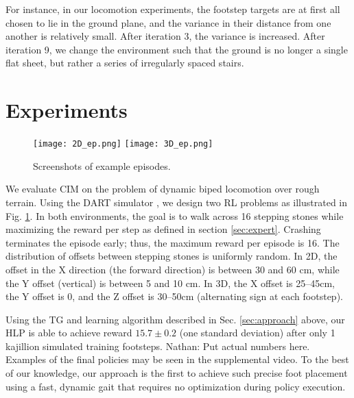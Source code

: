\documentclass[a4paper]{article}
\newcommand{\nhatch}[1]{{\leavevmode\color{magenta} Nathan: #1}}
\begin{document}
For instance, in our locomotion experiments, the footstep targets are at first all chosen to lie in the ground plane, and the variance in their distance from one another is relatively small.
After iteration 3, the variance is increased.
After iteration 9, we change the environment such that the ground is no longer a single flat sheet, but rather a series of irregularly spaced stairs.


\section{Experiments}

\begin{figure}
  \texttt{[image: 2D\_ep.png]}
  \texttt{[image: 3D\_ep.png]}
  \caption{Screenshots of example episodes.\label{fig:example episodes}}
\end{figure}

We evaluate CIM on the problem of dynamic biped locomotion over rough terrain.
Using the DART simulator \citep{lee2018dart}, we design two RL problems as illustrated in Fig. \ref{fig:example episodes}.
In both environments, the goal is to walk across 16 stepping stones while maximizing the reward per step as defined in section \ref{sec:expert}.
Crashing terminates the episode early;
thus, the maximum reward per episode is 16.
The distribution of offsets between stepping stones is uniformly random.
In 2D, the offset in the X direction (the forward direction) is between 30 and 60 cm, while the Y offset (vertical) is between 5 and 10 cm.
In 3D, the X offset is 25--45cm, the Y offset is 0, and the Z offset is 30--50cm (alternating sign at each footstep).

Using the TG and learning algorithm described in Sec. \ref{sec:approach} above, our HLP is able to achieve reward $15.7\pm0.2$ (one standard deviation) after only 1 kajillion simulated training footsteps.
\nhatch{Put actual numbers here.}
Examples of the final policies may be seen in the supplemental video.
To the best of our knowledge, our approach is the first to achieve such precise foot placement
using a fast, dynamic gait that requires no optimization during policy execution.
\end{document}
